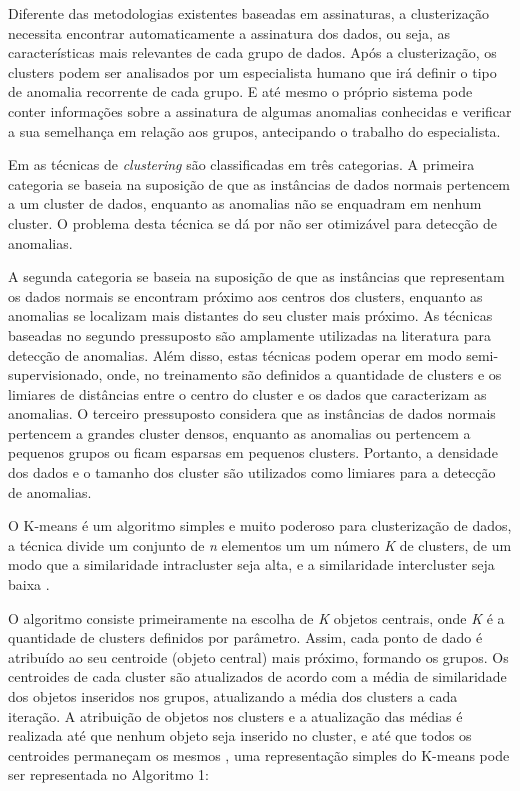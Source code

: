 \indent Diferente das metodologias existentes baseadas em assinaturas, a clusterização necessita encontrar automaticamente a assinatura dos dados, ou seja, as características mais relevantes de cada grupo de dados. Após a clusterização, os clusters podem ser analisados por um especialista humano que irá definir o tipo de anomalia recorrente de cada grupo. E até mesmo o próprio sistema pode conter informações sobre a assinatura de algumas anomalias conhecidas e verificar a sua semelhança em relação aos grupos, antecipando o trabalho do especialista.

\indent Em   as técnicas de \textit{clustering} são classificadas em três categorias. A primeira categoria se baseia na suposição de que as instâncias de dados normais pertencem a um cluster de dados, enquanto as anomalias não se enquadram em nenhum cluster. O problema desta técnica se dá por não ser otimizável para detecção de anomalias.

\indent A segunda categoria se baseia na suposição de que as instâncias que representam os dados normais se encontram próximo aos centros dos clusters, enquanto as anomalias se localizam mais distantes do seu cluster mais próximo. As técnicas baseadas no segundo pressuposto são amplamente utilizadas na literatura para detecção de anomalias. Além disso, estas técnicas podem operar em modo semi-supervisionado, onde, no treinamento são definidos a quantidade de clusters e os limiares de distâncias entre o centro do cluster e os dados que caracterizam as anomalias. O terceiro pressuposto considera que as instâncias de dados normais pertencem a grandes cluster  densos, enquanto as anomalias ou pertencem a pequenos grupos ou ficam esparsas em pequenos clusters. Portanto, a densidade dos dados e o tamanho dos cluster são utilizados como limiares para a detecção de anomalias.

\indent O K-means é um algoritmo simples e muito poderoso para clusterização de dados, a técnica divide um conjunto de \textit{n} elementos um um número \textit{K} de clusters, de um modo que a similaridade intracluster seja alta, e a similaridade intercluster seja baixa \cite{goldschmidt2005}.

\indent O algoritmo consiste primeiramente na escolha de \textit{K} objetos centrais, onde \textit{K} é a quantidade de clusters definidos por parâmetro. Assim, cada ponto de dado é atribuído ao seu centroide (objeto central) mais próximo, formando os grupos. Os centroides de cada cluster são atualizados de acordo com a média de similaridade dos objetos inseridos nos grupos, atualizando a média dos clusters a cada iteração. A atribuição de objetos nos clusters e a atualização das médias é realizada até que nenhum objeto seja inserido no cluster, e até que todos os centroides permaneçam os mesmos \cite{Tan2005}, uma representação simples do K-means pode ser representada no Algoritmo 1:
\vspace{0.4cm}

